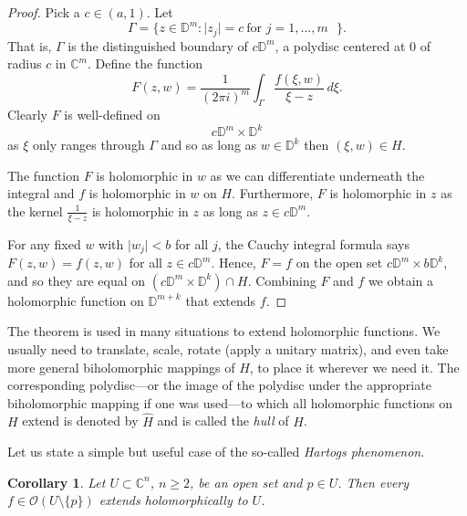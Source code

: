 \documentclass[12pt,openany]{book}
\newcommand{\sabs}[1]{\lvert {#1} \rvert}
\newcommand{\C}{{\mathbb{C}}}
\newcommand{\D}{{\mathbb{D}}}
\newcommand{\sO}{{\mathscr{O}}}
\newcommand{\myindex}[1]{#1\index{#1}}
\theoremstyle{plain}
\newtheorem{cor}[thm]{Corollary}
\theoremstyle{remark}
\theoremstyle{definition}
\theoremstyle{exercise}
\theoremstyle{example}
\begin{document}
\begin{proof}
Pick a $c \in (a,1)$.  Let
\begin{equation*}
\Gamma =
\bigl\{ z \in \D^{m} : \sabs{z_j} = c ~\text{for $j=1,\ldots,m$ } \bigr\}.
\end{equation*}
That is, $\Gamma$ is the distinguished boundary of $c \D^m$,
a polydisc centered at 0 of radius $c$ in $\C^m$.
Define the function
\begin{equation*}
F(z,w)
=
\frac{1}{{(2\pi i)}^m}
\int_\Gamma \frac{f(\xi,w)}{\xi-z} \, d\xi .
\end{equation*}
Clearly $F$ is well-defined on
\begin{equation*}
c\D^m \times \D^k
\end{equation*}
as $\xi$ only
ranges through $\Gamma$ and so as long as $w \in \D^k$ then $(\xi,w) \in H$.

The function $F$ is holomorphic in $w$ as we can differentiate
underneath the integral and $f$ is holomorphic in $w$ on $H$.  Furthermore,
$F$ is holomorphic in $z$ as the kernel $\frac{1}{\xi-z}$ is holomorphic in
$z$ as long as $z \in c\D^m$.

For any fixed $w$ with $\sabs{w_j} < b$ for all $j$,
the Cauchy integral formula says
$F(z,w) = f(z,w)$ for all $z \in c \D^m$.
Hence, $F=f$ on the open set
$c\D^m \times b\D^k$,
and so they are equal on 
$(c\D^m \times \D^k) \cap H$.
Combining $F$ and $f$ we obtain a holomorphic
function on $\D^{m+k}$ that extends $f$.
\end{proof}

The theorem is used 
in many situations to extend holomorphic functions.
We usually need to
translate, scale, 
rotate (apply a unitary matrix),
and even take more general biholomorphic mappings
of $H$, to place it wherever we need it.  The corresponding polydisc---or the image of
the polydisc under the appropriate biholomorphic mapping if one was
used---to which all holomorphic functions on $H$ extend is denoted
by $\widehat{H}$ and is called the \emph{hull} of $H$.%

Let us state a simple but useful case of the so-called
\emph{\myindex{Hartogs phenomenon}}.

\begin{cor}
Let $U \subset \C^n$, $n \geq 2$, be an open set and $p \in U$.
Then every $f \in \sO(U \setminus \{ p \} )$
extends holomorphically to $U$.
\end{cor}
\end{document}

